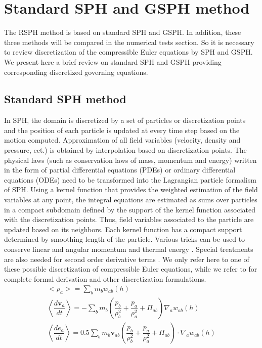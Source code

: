 \documentclass[review]{elsarticle}
\begin{document}
\section{Standard SPH and GSPH method}
The RSPH method is based on standard SPH and GSPH. In addition, these three methods will be compared in the numerical tests section. So it is necessary to review discretization of the compressible Euler equations by SPH and GSPH. We present here a brief review on standard SPH and GSPH providing corresponding discretized governing equations.

\subsection{Standard SPH method}
In SPH, the domain is discretized by a set of particles or discretization points and the position of each particle is updated at every time step based on the motion computed. Approximation of all field variables (velocity, density and pressure, ect.) is obtained by interpolation based on discretization points. The physical laws (such as conservation laws of mass, momentum and energy) written in the form of partial differential equations (PDEs) or ordinary differential equations (ODEs) need to be transformed into the Lagrangian particle formalism of SPH. Using a kernel function that provides the weighted estimation of the field variables at any point, the integral equations are estimated as sums over particles in a compact subdomain defined by the support of the kernel function associated with the discretization points. Thus, field variables associated to the particle are updated based on its neighbors. Each kernel function has a compact support determined by smoothing length of the particle. Various tricks can be used to conserve linear and angular momentum and thermal energy \citep{monaghan1992smoothed}. Special treatments are also needed for second order derivative terms \citep{monaghan2005smoothed}. We only refer here to one of these possible discretization of compressible Euler equations, while we refer to \citet{ monaghan2005smoothed, liu2010smoothed, price2012smoothed} for complete formal derivation and other discretization formulations.
\begin{align}
<\rho_a> = \sum_b m_b w_{ab} \left(h\right) \label{eq:ns-sph-d} \\
\left\langle\dfrac{d \textbf{v}_a}{d t}\right\rangle = -\sum_b m_b \left(\dfrac{p_b}{\rho_b^2} + \dfrac{p_a}{\rho_a^2} + \Pi_{ab}\right) \nabla_a w_{a b}\left(h\right) \label{eq:ns-sph-v} \\
\left\langle\dfrac{d e_a}{d t}\right\rangle=
 0.5\sum_b m_b \textbf{v}_{a b}\left(\dfrac{p_b}{\rho_b^2} + \dfrac{p_a}{\rho_a^2} + \Pi_{ab}\right) \cdot \nabla_a w_{a b}\left(h\right) \label{eq:ns-sph-e}
\end{align}
\end{document}
